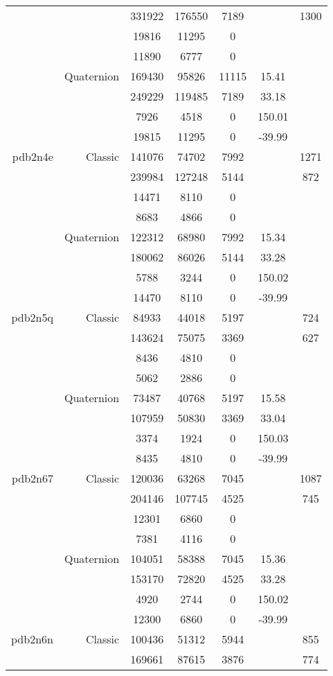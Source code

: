 \begin{xltabular}{\textwidth}{r|rcccSc}
& & 331922 & 176550 & 7189 & & 1300 \\
& & 19816 & 11295 & 0 & & \\
& & 11890 & 6777 & 0 & & \\
& Quaternion & 169430 & 95826 & 11115 & 15.41 & \\
& & 249229 & 119485 & 7189 & 33.18 & \\
& & 7926 & 4518 & 0 & 150.01 & \\
& & 19815 & 11295 & 0 & -39.99 & \\ \addlinespace
pdb2n4e & Classic & 141076 & 74702 & 7992 & & 1271 \\
& & 239984 & 127248 & 5144 & & 872 \\
& & 14471 & 8110 & 0 & & \\
& & 8683 & 4866 & 0 & & \\
& Quaternion & 122312 & 68980 & 7992 & 15.34 & \\
& & 180062 & 86026 & 5144 & 33.28 & \\
& & 5788 & 3244 & 0 & 150.02 & \\
& & 14470 & 8110 & 0 & -39.99 & \\ \addlinespace
pdb2n5q & Classic & 84933 & 44018 & 5197 & & 724 \\
& & 143624 & 75075 & 3369 & & 627 \\
& & 8436 & 4810 & 0 & & \\
& & 5062 & 2886 & 0 & & \\
& Quaternion & 73487 & 40768 & 5197 & 15.58 & \\
& & 107959 & 50830 & 3369 & 33.04 & \\
& & 3374 & 1924 & 0 & 150.03 & \\
& & 8435 & 4810 & 0 & -39.99 & \\ \addlinespace
pdb2n67 & Classic & 120036 & 63268 & 7045 & & 1087 \\
& & 204146 & 107745 & 4525 & & 745 \\
& & 12301 & 6860 & 0 & & \\
& & 7381 & 4116 & 0 & & \\
& Quaternion & 104051 & 58388 & 7045 & 15.36 & \\
& & 153170 & 72820 & 4525 & 33.28 & \\
& & 4920 & 2744 & 0 & 150.02 & \\
& & 12300 & 6860 & 0 & -39.99 & \\ \addlinespace
pdb2n6n & Classic & 100436 & 51312 & 5944 & & 855 \\
& & 169661 & 87615 & 3876 & & 774 \\

\end{xltabular}
